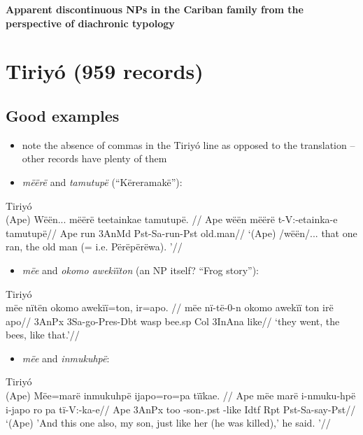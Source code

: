 \documentclass[10pt]{article}
\begin{document}
\begin{center}
\Large \bfseries {Apparent discontinuous NPs in the Cariban family from the perspective of diachronic typology}
\end{center}

\section{\texorpdfstring{Tiriyó (959 records)
\label{sec:tri}}{Tiriyó (959 records) }}

\subsection{Good examples}

\begin{itemize}
\item
  note the absence of commas in the Tiriyó line as opposed to the
  translation -- other records have plenty of them
\item
  \emph{mëërë} and \emph{tamutupë} (``Këreramakë''):
\end{itemize}

\ex Tiriyó \\
\label{dados-09-kereramake-p-043-278}    \begingl
    \glpreamble (Ape) Wëën... mëërë  teetainkae                tamutupë. //
    \gla Ape wëën mëërë t-V:-etainka-e tamutupë//
    \glb Ape run 3AnMd Pst-Sa-run-Pst old.man//
        \glft ‘(Ape) /wëën/... that one ran, the old man (= i.e. Përëpërëwa).  ’//  
    \endgl 
\xe

\begin{itemize}
\tightlist
\item
  \emph{mëe} and \emph{okomo awekïïton} (an NP itself? ``Frog story''):
\end{itemize}

\ex Tiriyó \\
\label{dados-07-frog-story-marciano-p-089-032}    \begingl
    \glpreamble mëe   nïtën              okomo   awekïï=ton,  ir=apo. //
    \gla mëe nï-të-0-n okomo awekïï ton irë apo//
    \glb 3AnPx 3Sa-go-Pres-Dbt wasp bee.sp Col 3InAna like//
        \glft ‘they went, the bees, like that.’//  
    \endgl 
\xe

\begin{itemize}
\tightlist
\item
  \emph{mëe} and \emph{inmukuhpë}:
\end{itemize}

\ex Tiriyó \\
\label{dados-09-kereramake-p-049-415}    \begingl
    \glpreamble (Ape) Mëe=marë   inmukuhpë         ijapo=ro=pa        tïïkae. //
    \gla Ape mëe marë i-nmuku-hpë i-japo ro pa tï-V:-ka-e//
    \glb Ape 3AnPx too -son-.pst -like Idtf Rpt Pst-Sa-say-Pst//
        \glft ‘(Ape) 'And this one also, my son, just like her (he was killed),' he said.  ’//  
    \endgl 
\xe
\end{document}
